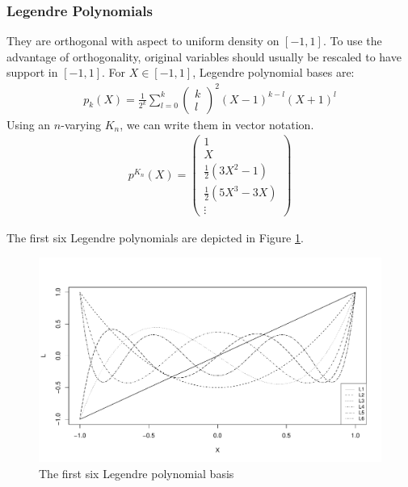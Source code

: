 \documentclass[12pt, a4paper]{article}
\theoremstyle{MAstyle} \newtheorem{assumption}{Assumption}[section]
\theoremstyle{MAstyle} \newtheorem{definition}{Definition}[section]
\theoremstyle{MAstyle} \newtheorem{theorem}{Theorem}[section]
\theoremstyle{MAstyle} \newtheorem{corollary}{Corollary}[section]
\begin{document}
        \subsubsection{Legendre Polynomials}\label{legendre_poly}
        They are orthogonal with aspect to uniform density on $[-1,1]$. To use the advantage of orthogonality, original variables should usually be rescaled to have support in $[-1,1]$. For $X \in [-1,1]$, Legendre polynomial bases are:
        \begin{align*}
            p_k(X)=\frac{1}{2^k}\sum_{l=0}^{k}
            \begin{pmatrix}
                k\\
                l
            \end{pmatrix}
            ^2 (X-1)^{k-l}(X+1)^{l}
        \end{align*}
        Using an $n$-varying $K_n$, we can write them in vector notation.
        \begin{align}
            p^{K_n}(X)=
            \begin{pmatrix}
                1  \\
                X  \\
                \frac{1}{2}(3X^2-1) \\
                \frac{1}{2}(5X^3-3X)\\
                \vdots
            \end{pmatrix} 
        \end{align}
        
        The first six Legendre polynomials are depicted in Figure \ref{legendre_poly_plot}.
        
        \begin{figure}[H]
		\includegraphics[width = 1.0\textwidth,trim= {{0\textwidth} {0\textwidth} {0\textwidth} {0.1\textwidth}}, clip=true] {Graphics/legendre.plot.pdf}
		\caption{The first six Legendre polynomial basis}
		\label{legendre_poly_plot}
	\end{figure}
\end{document}
